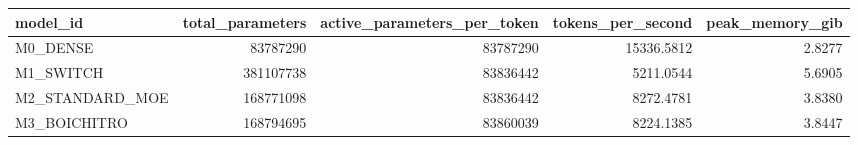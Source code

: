 \begin{tabular}{lrrrr}
\toprule
model\_id & total\_parameters & active\_parameters\_per\_token & tokens\_per\_second & peak\_memory\_gib \\
\midrule
M0\_DENSE & 83787290 & 83787290 & 15336.5812 & 2.8277 \\
M1\_SWITCH & 381107738 & 83836442 & 5211.0544 & 5.6905 \\
M2\_STANDARD\_MOE & 168771098 & 83836442 & 8272.4781 & 3.8380 \\
M3\_BOICHITRO & 168794695 & 83860039 & 8224.1385 & 3.8447 \\
\bottomrule
\end{tabular}
